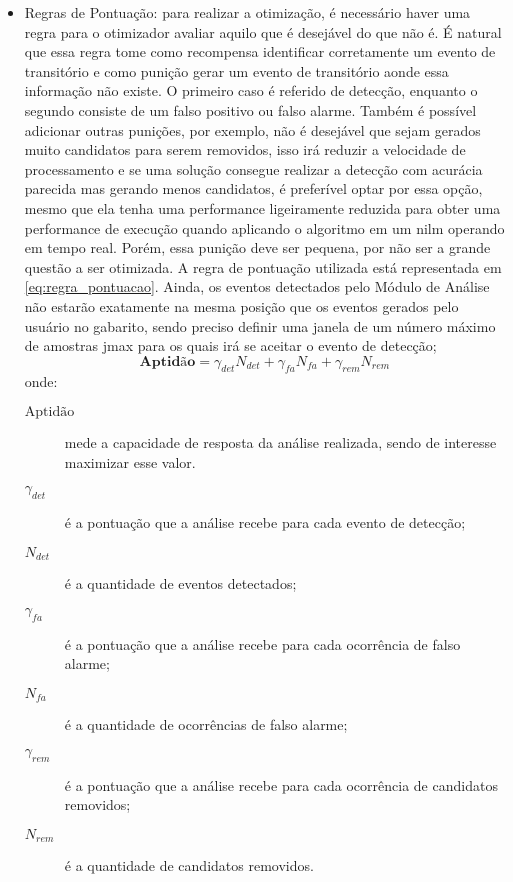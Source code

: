\begin{itemize}
\item Regras de Pontuação: para realizar a otimização, é necessário
haver uma regra para o otimizador avaliar aquilo que é desejável do
que não é. É natural que essa regra tome como recompensa identificar
corretamente um evento de transitório e como punição gerar um evento
de transitório aonde essa informação não existe. O primeiro caso é
referido de detecção, enquanto o segundo consiste de um falso positivo
ou falso alarme. Também é possível adicionar outras punições, por
exemplo, não é desejável que sejam gerados muito candidatos para serem
removidos, isso irá reduzir a velocidade de processamento e se uma
solução consegue realizar a detecção com acurácia parecida mas gerando
menos candidatos, é preferível optar por essa opção, mesmo que ela
tenha uma performance ligeiramente reduzida para obter uma performance
de execução quando aplicando o algoritmo em um \gls{nilm} operando em
tempo real. Porém, essa punição deve ser pequena, por não ser a
grande questão a ser otimizada. A regra de pontuação utilizada está
representada em \ref{eq:regra_pontuacao}. Ainda, os eventos detectados
pelo Módulo de Análise não estarão exatamente na mesma posição que os
eventos gerados pelo usuário no gabarito, sendo preciso definir uma
janela de um número máximo de amostras \acs{jmax} para os quais irá
se aceitar o evento de detecção;
\begin{equation}\label{eq:regra_pontuacao}
\textbf{Aptidão}=\gamma_{det}N_{det}+\gamma_{fa}N_{fa}+\gamma_{rem}N_{rem}
\end{equation}
\noindent onde:
\begin{description}
\item[$\text{Aptidão}$] mede a capacidade de resposta da análise realizada,
sendo de interesse maximizar esse valor.
\item[$\gamma_{det}$] é a pontuação que a análise recebe para cada
evento de detecção;
\item[$N_{det}$] é a quantidade de eventos detectados;
\item[$\gamma_{fa}$] é a pontuação que a análise recebe para cada
ocorrência de falso alarme;
\item[$N_{fa}$] é a quantidade de ocorrências de falso alarme;
\item[$\gamma_{rem}$] é a pontuação que a análise recebe para cada
ocorrência de candidatos removidos;
\item[$N_{rem}$] é a quantidade de candidatos removidos.
\end{description}


\end{itemize}
